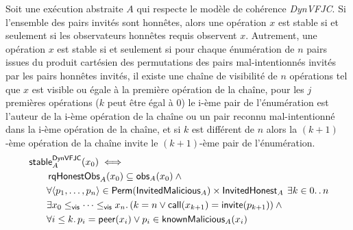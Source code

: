 \begin{theorem}\label{th:svfjc-stability}
Soit une exécution abstraite $A$ qui respecte le modèle de cohérence \emph{DynVFJC}.
Si l'ensemble des pairs invités sont honnêtes, alors une opération $x$ est stable si et seulement si les observateurs honnêtes requis observent $x$.
Autrement, une opération $x$ est stable si et seulement si pour chaque énumération de $n$ pairs issues du produit cartésien des permutations des pairs mal-intentionnés invités par les pairs honnêtes invités, il existe une chaîne de visibilité de $n$ opérations tel que $x$ est visible ou égale à la première opération de la chaîne, pour les $j$ premières opérations ($k$ peut être égal à $0$) le i-ème pair de l'énumération est l'auteur de la i-ème opération de la chaîne ou un pair reconnu mal-intentionné dans la i-ème opération de la chaîne, et si $k$ est différent de $n$ alors la $(k+1)$-ème opération de la chaîne invite le $(k+1)$-ème pair de l'énumération.
\begin{equation*}\begin{split}
\MoveEqLeft\trm{stable}_A^{\trm{DynVFJC}}(x_0) \iff\\
    &\trm{rqHonestObs}_A(x_0) \subseteq \trm{obs}_A(x_0) \:\land \\
    &\forall \tuple*{p_1, \dotsc, p_n} \in \trm{Perm}(\trm{InvitedMalicious}_A) \times \trm{InvitedHonest}_A
    \:\exists k \in 0 \ldotp\ldotp n \\
    & \exists x_0 \viseq \dotsb \viseq x_n \qsep
    (k = n \lor \trm{call}(x_{k+1}) = \trm{invite}(p_{k+1})) \:\land\\
    &\forall i \leq k \qsep p_i = \trm{peer}(x_i) \lor p_i \in \trm{knownMalicious}_A(x_i)
\end{split}\end{equation*}
\end{theorem}

